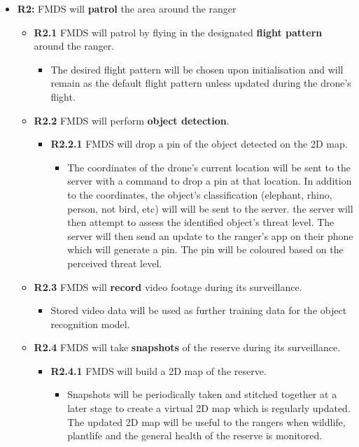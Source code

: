 \begin{flushleft}
		\begin{itemize}
			\item{\textbf{R2:}} FMDS will \textbf{patrol} the area around the ranger
				\begin{itemize}
					\item{\textbf{R2.1}} FMDS will patrol by flying in the designated \textbf{flight pattern} around the ranger.
						\begin{itemize}
							\item The desired flight pattern will be chosen upon initialisation and will remain as the default flight pattern unless updated during the drone's flight.
						\end{itemize}
					\item{\textbf{R2.2}} FMDS will perform \textbf{object detection}.
						\begin{itemize}
							\item{\textbf{R2.2.1}} FMDS will drop a pin of the object detected on the 2D map.
								\begin{itemize}
									\item The coordinates of the drone's current location will be sent to the server with a command to drop a pin at that location. In addition to the coordinates, the object's classification (elephant, rhino, person, not bird, etc) will will be sent to the server. the server will then attempt to assess the identified object's threat level. The server will then send an update to the ranger's app on their phone which will generate a pin. The pin will be coloured based on the perceived threat level. 
								\end{itemize} 
						\end{itemize}
					\item{\textbf{R2.3}} FMDS will \textbf{record} video footage during its surveillance.
						\begin{itemize}
							\item Stored video data will be used as further training data for the object recognition model.
						\end{itemize} 
					\item{\textbf{R2.4}} FMDS will take \textbf{snapshots} of the reserve during its surveillance.
						\begin{itemize}
							\item{\textbf{R2.4.1}} FMDS will build a 2D map of the reserve.
								\begin{itemize}
									\item Snapshots will be periodically taken and stitched together at a later stage to create a virtual 2D map which is regularly updated. The updated 2D map will be useful to the rangers when wildlife, plantlife and the general health of the reserve is monitored.
								\end{itemize} 
						\end{itemize}
				\end{itemize}
		\end{itemize}
	\end{flushleft}

